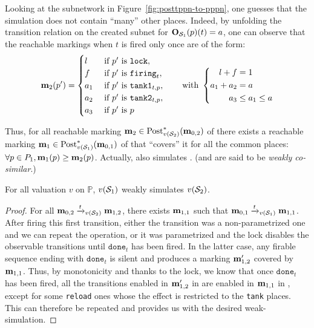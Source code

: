 Looking at the subnetwork in Figure~\ref{fig:posttppn-to-pppn},
one guesses that the simulation does not contain “many” other places.
Indeed, by unfolding the transition relation on the created subnet for $\matO_{\PPNi}(p)(t) = a$, one can observe that the reachable markings when $t$ is fired only once are of the form:
\[
  \mar_2(p') =
  \begin{cases}
    l   &\text{ if } p' \text{ is } \mathtt{lock}, \\
    f   &\text{ if } p' \text{ is } \mathtt{firing}_t, \\
    a_1 &\text{ if } p' \text{ is } \mathtt{tank1}_{t,p}, \\
    a_2 &\text{ if } p' \text{ is } \mathtt{tank2}_{t,p}, \\
    a_3 &\text{ if } p' \text{ is } p
  \end{cases}
  \text{\qquad with }
  \left\{
    \begin{aligned}
      l + f &= 1 \\
      a_1 + a_2 &= a \\
      a_3 &\leq a_1 \leq a
    \end{aligned}
  \right.
\]

Thus, for all reachable marking $\mar_2 \in \Post^*_{v(\PPNii)}(\mar_{0,2})$ of \PPNii there exists a reachable marking $\mar_1 \in \Post^*_{v(\PPNi)}(\mar_{0,1})$ of \PPNi that ``covers'' it for all the common places: $\forall p \in P_1, \mar_1(p) \geq \mar_2(p)$.
Actually, \PPNi also simulates \PPNii.
(\PPNi and \PPNii are said to be \emph{weakly co-similar}.)

\begin{lemm}
  For all valuation $v$ on $\mathbb{P}$, $v(\PPNi)$ weakly simulates $v(\PPNii)$.
\end{lemm}

\begin{proof}
  For all $\mar_{0,2} \fire[\val(\PPNii)]{t} \mar_{1,2}$, there exists $\mar_{1,1}$ such that $\mar_{0,1} \fire[v(\PPNi)]{t} \mar_{1,1}$.
  After firing this first transition, either the transition was a non-parametrized one and we can repeat the operation, or it was parametrized and the lock disables the observable transitions until $\mathtt{done}_t$ has been fired.
  In the latter case, any firable sequence ending with $\mathtt{done}_t$ is silent and produces a marking $\mar'_{1,2}$ covered by $\mar_{1,1}$.
  Thus, by monotonicity and thanks to the lock, we know that once $\mathtt{done}_t$ has been fired, all the transitions enabled in $\mar'_{1,2}$ in \PPNii are enabled in $\mar_{1,1}$ in \PPNi, except for some \texttt{reload} ones whose the effect is restricted to the \texttt{tank} places.
  This can therefore be repeated and provides us with the desired weak-simulation.
\end{proof}

